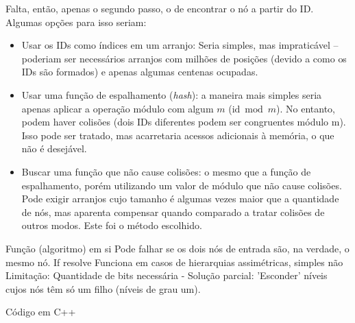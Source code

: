 

Falta, então, apenas o segundo passo, o de encontrar o nó a partir do ID.
Algumas opções para isso seriam:
\begin{itemize}
	\item Usar os IDs como índices em um arranjo: Seria simples, mas impraticável -- poderiam ser necessários arranjos com milhões de posições (devido a como os IDs são formados) e apenas algumas centenas ocupadas.
	\item Usar uma função de espalhamento (\textit{hash}): a maneira mais simples seria apenas aplicar a operação módulo com algum $m$ ($\mathrm{id} \bmod m$).
	No entanto, podem haver colisões (dois IDs diferentes podem ser congruentes módulo m).
	Isso pode ser tratado, mas acarretaria acessos adicionais à memória, o que não é desejável.
	\item Buscar uma função que não cause colisões: o mesmo que a função de espalhamento, porém utilizando um valor de módulo que não cause colisões.
	Pode exigir arranjos cujo tamanho é algumas vezes maior que a quantidade de nós, mas aparenta compensar quando comparado a tratar colisões de outros modos.
	Este foi o método escolhido.
\end{itemize}



Função (algoritmo) em si
Pode falhar se os dois nós de entrada são, na verdade, o mesmo nó. If resolve
Funciona em casos de hierarquias assimétricas, simples não
Limitação: Quantidade de bits necessária - Solução parcial: 'Esconder' níveis cujos nós têm só um filho (níveis de grau um).


Código em C++





